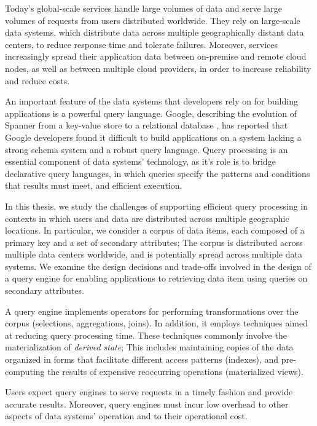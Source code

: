 

Today's global-scale services handle large volumes of data and serve large volumes of requests from users distributed worldwide.
They rely on large-scale data systems,
which distribute data across multiple geographically distant data centers,
to reduce response time and tolerate failures.
Moreover, services increasingly spread their application data between on-premise and remote cloud nodes,
as well as between multiple cloud providers, in order to increase reliability and reduce costs.

An important feature of the data systems that developers rely on for building applications is a powerful query language.
Google, describing the evolution of Spanner from a key-value store to a relational database \cite{corbett:spanner},
has reported that Google developers found it difficult to build applications on a system lacking a strong schema system
and a robust query language.
Query processing is an essential component of data systems' technology, as it's role is to bridge declarative query languages,
in which queries specify the patterns and conditions that results must meet, and efficient execution.

\bigskip
\noindent
In this thesis, we study the challenges of supporting efficient query processing in contexts in which users and data are
distributed across multiple geographic locations.
In particular, we consider a corpus of data items, each composed of a primary key and a set of secondary attributes;
The corpus is distributed across multiple data centers worldwide, and is potentially spread across multiple data systems.
We examine the design decisions and trade-offs involved in the design of a query engine for enabling applications to
retrieving data item using queries on secondary attributes.

A query engine implements operators for performing transformations over the corpus (selections, aggregations, joins).
In addition, it employs techniques aimed at reducing query processing time.
These techniques commonly involve the materialization of \textit{derived state};
This includes maintaining copies of the data organized in forms that facilitate different access patterns (indexes),
and pre-computing the results of expensive reoccurring operations (materialized views).

\bigskip
\noindent
Users expect query engines to serve requests in a timely fashion and provide accurate results.
Moreover, query engines must incur low overhead to other aspects of data systems' operation and to their operational cost.

